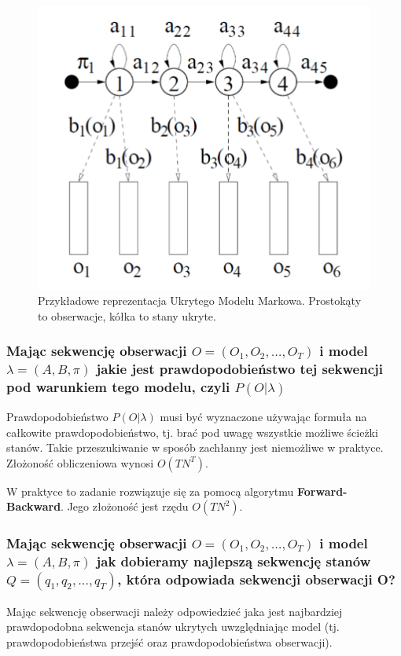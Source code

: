 \documentclass[wi]{zut}
\begin{document}
\begin{figure}[H]
    \centering
    \includegraphics[width=0.5\linewidth]{images/hidden_markov.png}
    \caption{Przykładowe reprezentacja Ukrytego Modelu Markowa. Prostokąty to obserwacje, kółka to stany ukryte.}
    \label{fig:pdgd}
\end{figure}

\subsubsection{Mając sekwencję obserwacji $O = (O_1, O_2, \ldots, O_T)$ i model $\lambda = (A, B, \pi)$ jakie jest prawdopodobieństwo tej sekwencji pod warunkiem tego modelu, czyli $P(O|\lambda)$}

Prawdopodobieństwo $P(O|\lambda)$ musi być wyznaczone używając formuła na całkowite prawdopodobieństwo, tj. brać pod uwagę wszystkie możliwe ścieżki stanów. Takie przeszukiwanie w sposób zachłanny jest niemożliwe w praktyce. Złożoność obliczeniowa wynosi $O(TN^T)$\cite{Pietrzykowski2020}. 

W praktyce to zadanie rozwiązuje się za pomocą algorytmu \textbf{Forward-Backward}. Jego złożoność jest rzędu $O(TN^2)$\cite{Pietrzykowski2020}.

\subsubsection{Mając sekwencję obserwacji $O = (O_1, O_2, \ldots, O_T)$ i model $\lambda = (A, B, \pi)$ jak dobieramy najlepszą sekwencję stanów $Q = (q_1, q_2, \ldots, q_T)$, która odpowiada sekwencji obserwacji O?}

Mając sekwencję obserwacji należy odpowiedzieć jaka jest najbardziej prawdopodobna sekwencja stanów ukrytych uwzględniając model (tj. prawdopodobieństwa przejść oraz prawdopodobieństwa obserwacji).
\end{document}

